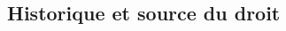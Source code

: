 \documentclass[10pt, french]{article}
\begin{document}
\begin{multicols*}{3} %
\section{Historique et source du droit}














\end{multicols*}
\end{document}
